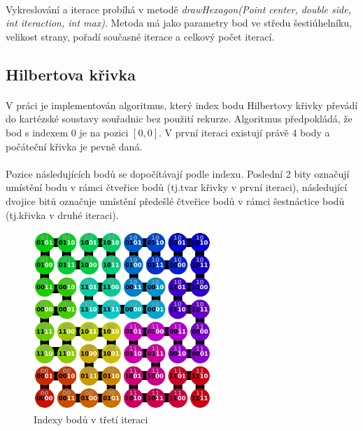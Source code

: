 \documentclass[12pt]{scrartcl}
\begin{document}
\paragraph{}
Vykreslování a iterace probíhá v metodě \emph{drawHexagon(Point center, double side, int iteraction, int max)}. Metoda má jako parametry bod ve středu šestiúhelníku, velikost strany, pořadí současné iterace a celkový počet iterací.
\newpage
\subsection{Hilbertova křivka}
\paragraph{}
V práci je implementován algoritmus, který index bodu Hilbertovy křivky převádí do kartézské soustavy souřadnic bez použití rekurze. Algoritmus předpokládá, že bod s indexem $0$ je na pozici $[0,0]$. V první iteraci existují právě 4 body a počáteční křivka je pevně daná.

\paragraph{}
Pozice následujících bodů se dopočítávají podle indexu. Poslední 2 bity označují umístění bodu v rámci čtveřice bodů (tj.\nobreakspace tvar křivky v první iteraci), následující dvojice bitů označuje umístění předešlé čtveřice bodů v rámci šestnáctice bodů (tj.\nobreakspace křivka v druhé iteraci).

\begin{figure}[!ht]
	\centering
	\includegraphics[width=0.6\textwidth,natwidth=1,natheight=1]{hilbert.pdf}
	\caption{Indexy bodů v třetí iteraci}
\end{figure}
\end{document}
